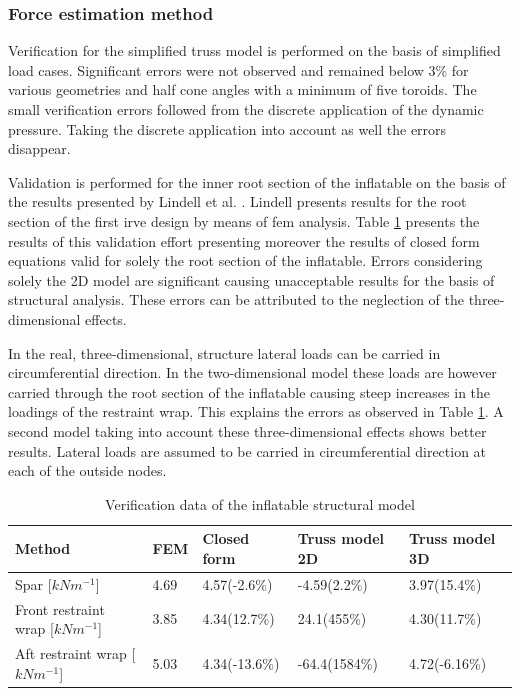 \subsubsection{Force estimation method}

Verification for the simplified truss model is performed on the basis of simplified load cases. Significant errors were not observed and remained below 3\% for various geometries and half cone angles with a minimum of five toroids. The small verification errors followed from the discrete application of the dynamic pressure. Taking the discrete application into account as well the errors disappear.

Validation is performed for the inner root section of the inflatable on the basis of the results presented by Lindell et al. \cite{Lindell2006}. Lindell presents results for the root section of the first \gls{irve} design by means of \gls{fem} analysis. Table \ref{tab:struc_val} presents the results of this validation effort presenting moreover the results of closed form equations valid for solely the root section of the inflatable. Errors considering solely the 2D model are significant causing unacceptable results for the basis of structural analysis. These errors can be attributed to the neglection of the three-dimensional effects. 

In the real, three-dimensional, structure lateral loads can be carried in circumferential direction. In the two-dimensional model these loads are however carried through the root section of the inflatable causing steep increases in the loadings of the restraint wrap. This explains the errors as observed in Table \ref{tab:struc_val}. A second model taking into account these three-dimensional effects shows better results. Lateral loads are assumed to be carried in circumferential direction at each of the outside nodes. 

\begin{table}[h]
\caption{Verification data of the inflatable structural model}
\hspace{-5mm}
\label{tab:struc_val} 
\begin{tabular}{|l|l|l|l|l|} \hline
Method                            & FEM \cite{Lindell2006} & Closed form \cite{Lindell2006} & Truss model 2D & Truss model 3D \\ \hline \hline
Spar [$kNm^{-1}$]                 & 4.69                     & 4.57(-2.6\%)                     & -4.59(2.2\%)   & 3.97(15.4\%)   \\ \hline
Front restraint wrap [$kNm^{-1}$] & 3.85                     & 4.34(12.7\%)                     & 24.1(455\%)    & 4.30(11.7\%)   \\ \hline
Aft restraint wrap [$kNm^{-1}$]   & 5.03                     & 4.34(-13.6\%)                    & -64.4(1584\%)  & 4.72(-6.16\%) \\ \hline
\end{tabular}
\end{table}

